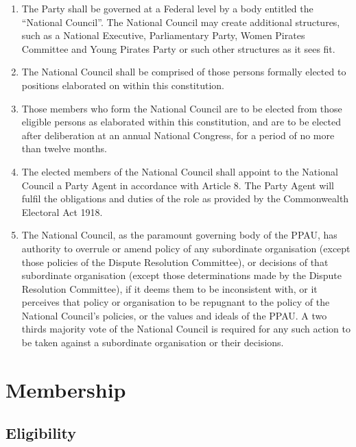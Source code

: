 \documentclass[a4paper,titlepage,8.5pt]{article}
\begin{document}
\begin{enumerate}
\item The Party shall be governed at a Federal level by a body entitled the ``National Council''. The National Council may create additional structures, such as a National Executive, Parliamentary Party, Women Pirates Committee and Young Pirates Party or such other structures as it sees fit.
\item The National Council shall be comprised of those persons formally elected to positions elaborated on within this constitution.
\item Those members who form the National Council are to be elected from those eligible persons as elaborated within this constitution, and are to be elected after deliberation at an annual National Congress, for a period of no more than twelve months.
\item The elected members of the National Council shall appoint to the National Council a Party Agent in accordance with Article 8. The Party Agent will fulfil the obligations and duties of the role as provided by the Commonwealth Electoral Act 1918.
\item The National Council, as the paramount governing body of the PPAU, has authority to overrule or amend policy of any subordinate organisation (except those policies of the Dispute Resolution Committee), or decisions of that subordinate organisation (except those determinations made by the Dispute Resolution Committee), if it deems them to be inconsistent with, or it perceives that policy or organisation to be repugnant to the policy of the National Council’s policies, or the values and ideals of the PPAU. A two thirds majority vote of the National Council is required for any such action to be taken against a subordinate organisation or their decisions.
\end{enumerate}

\section{Membership}

\subsection{Eligibility}
\end{document}
